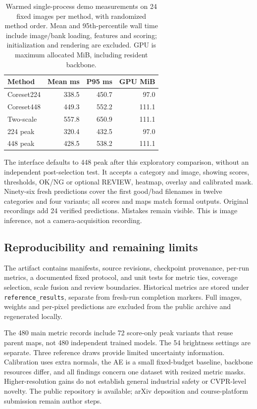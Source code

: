 \documentclass[10pt,twocolumn,letterpaper]{article}
\begin{document}
\begin{table}[h]\centering\scriptsize
\caption{Warmed single-process demo measurements on 24 fixed images per method, with randomized method order. Mean and 95th-percentile wall time include image/bank loading, features and scoring; initialization and rendering are excluded. GPU is maximum allocated MiB, including resident backbone.}
\begin{tabular}{lrrr}\toprule
Method & Mean ms & P95 ms & GPU MiB\\\midrule
Coreset224 & 338.5 & 450.7 & 97.0 \\
Coreset448 & 449.3 & 552.2 & 111.1 \\
Two-scale & 557.8 & 650.9 & 111.1 \\
224 peak & 320.4 & 432.5 & 97.0 \\
448 peak & 428.5 & 538.2 & 111.1 \\
\bottomrule\end{tabular}
\end{table}

The interface defaults to 448 peak after this exploratory comparison, without an independent post-selection test. It accepts a category and image, showing scores, thresholds, OK/NG or optional REVIEW, heatmap, overlay and calibrated mask. Ninety-six fresh predictions cover the first good/bad filenames in twelve categories and four variants; all scores and maps match formal outputs. Original recordings add 24 verified predictions. Mistakes remain visible. This is image inference, not a camera-acquisition recording.
\subsection{Reproducibility and remaining limits}
The artifact contains manifests, source revisions, checkpoint provenance, per-run metrics, a documented fixed protocol, and unit tests for metric ties, coverage selection, scale fusion and review boundaries. Historical metrics are stored under \texttt{reference\_results}, separate from fresh-run completion markers. Full images, weights and per-pixel predictions are excluded from the public archive and regenerated locally.

The 480 main metric records include 72 score-only peak variants that reuse parent maps, not 480 independent trained models. The 54 brightness settings are separate. Three reference draws provide limited uncertainty information. Calibration uses extra normals, the AE is a small fixed-budget baseline, backbone resources differ, and all findings concern one dataset with resized metric masks. Higher-resolution gains do not establish general industrial safety or CVPR-level novelty. The public repository is available; arXiv deposition and course-platform submission remain author steps.
\end{document}
